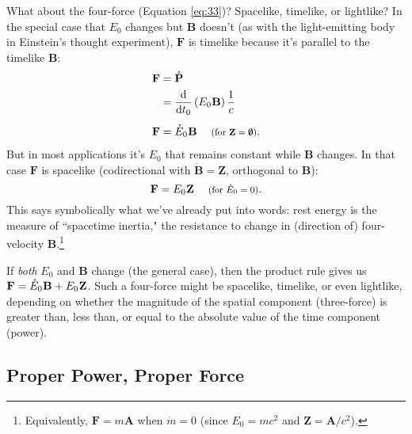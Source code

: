 \documentclass[12pt]{article}
\renewcommand{\vv}[1]{\mathbf{#1}}
\newcommand{\dd}[1]{\mathrm{d}#1}
\begin{document}
What about the four-force (Equation \ref{eq:33})? Spacelike, timelike, or lightlike? In the special case that $E_0$ changes but $\vv B$ doesn't (as with the light-emitting body in Einstein's thought experiment), $\vv F$ is timelike because it's parallel to the timelike $\vv B$:
\begin{equation}\label{eq:38}
\begin{split}
\vv F &= \mathring{\vv P}\\
&= \frac{\dd}{\dd t_0} \left( E_0 \mkern.5mu \vv B \right) \frac{1}{c}\\[5pt]
\vv F &= \mathring E_0 \mkern.5mu \vv B \quad \textrm{\footnotesize{ (for $\vv Z = \textrm{\mbox{\boldmath $\emptyset$}}$)}}.
\end{split}
\end{equation}
But in most applications it's $E_0$ that remains constant while $\vv B$ changes. In that case $\vv F$ is spacelike (codirectional with $\mathring{\vv B} = \vv Z$, orthogonal to $\vv B$):
\begin{equation}\label{eq:39}
\vv F = E_0 \mkern.5mu \vv Z \quad \textrm{\footnotesize{ (for $\mathring{E}_0 = 0$)}}.
\end{equation}
This says symbolically what we've already put into words: rest energy is the measure of ``spacetime inertia," the resistance to change in (direction of) four-velocity $\vv B$.\footnote{Equivalently, $\vv F = m \vv A$ when $\mathring{m} = 0$ (since $E_0 = mc^2$ and $\vv Z = \vv A / c^2$).}

If \emph{both} $E_0$ and $\vv B$ change (the general case), then the product rule gives us $\vv F = \mathring E_0 \mkern.5mu \vv B + E_0 \mkern.5mu \vv Z$. Such a four-force might be spacelike, timelike, or even lightlike, depending on whether the magnitude of the spatial component (three-force) is greater than, less than, or equal to the absolute value of the time component (power).

\subsection{Proper Power, Proper Force}\label{ssec:pf}
\end{document}
